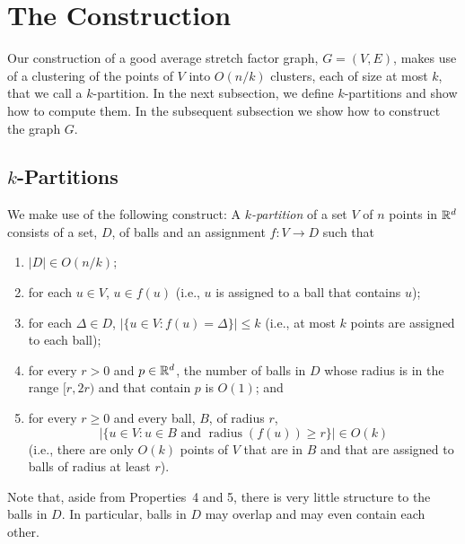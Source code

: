 \documentclass{patmorin}
\DeclareMathOperator{\asf}{asf}
\DeclareMathOperator{\radius}{radius}
\begin{document}
\section{The Construction}

Our construction of a good average stretch factor graph, $G=(V,E)$,
makes use of a clustering of the points of $V$ into $O(n/k)$ clusters,
each of size at most $k$, that we call a $k$-partition.  In the next
subsection, we define $k$-partitions and show how to compute them.
In the subsequent subsection we show how to construct the graph $G$.



\subsection{$k$-Partitions}

We make use of the following construct:  A \emph{$k$-partition} of a
set $V$ of $n$ points in $\mathbb{R}^d$ consists of a set, $D$, of balls and an
assignment $f:V\to D$ such that
\begin{enumerate}
  \item $|D|\in O(n/k)$;
  \item for each $u\in V$, $u\in f(u)$ (i.e., $u$ is assigned to a
    ball that contains $u$);
  \item for each $\Delta\in D$, $|\{u\in V: f(u)=\Delta\}|\le k$ (i.e.,
   at most $k$ points are assigned to each ball);
  \item for every $r> 0$ and $p\in\mathbb{R}^d$, the number of balls
   in $D$ whose radius is in the range $[r,2r)$ and that contain $p$
   is $O(1)$; and
  \item for every $r\ge 0$ and every ball, $B$, of radius $r$, 
   \[
      |\{ u\in V : u\in B\text{ and } \radius(f(u))\ge r\}| \in O(k)
   \] 
   (i.e., there are only $O(k)$ points
   of $V$ that are in $B$ and that are assigned to balls of radius at
   least $r$).
\end{enumerate}

Note that, aside from Properties~4 and 5, there is very little structure
to the balls in $D$. In particular, balls in $D$ may overlap and may
even contain each other.  
\end{document}
